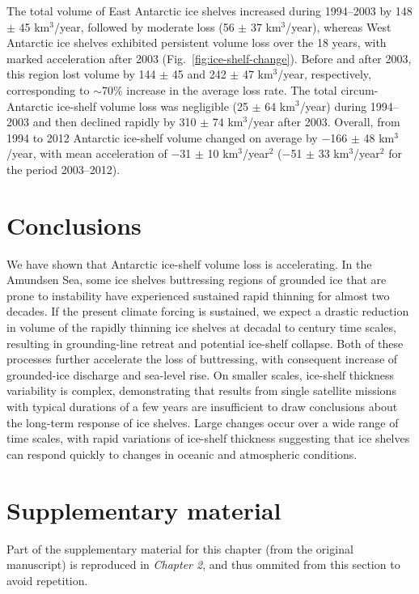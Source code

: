 The total volume of East Antarctic ice shelves
increased during 1994--2003 by 148 $\pm$ 45 km$^3$/year,
followed by moderate loss (56 $\pm$ 37 km$^3$/year),
whereas West Antarctic ice shelves exhibited
persistent volume loss over the 18 years, with
marked acceleration after 2003 (Fig.~\ref{fig:ice-shelf-change}). Before
and after 2003, this region lost volume by 144 $\pm$ 45 and 
242 $\pm$ 47 km$^3$/year, respectively, corresponding
to $\sim$70\% increase in the average loss
rate. The total circum-Antarctic ice-shelf volume
loss was negligible (25 $\pm$ 64 km$^3$/year) during
1994--2003 and then declined rapidly by 
310 $\pm$ 74 km$^3$/year after 2003. Overall, from 1994 to
2012 Antarctic ice-shelf volume changed on average
by $-$166 $\pm$ 48 km$^3$/year, with mean acceleration
of $-$31 $\pm$ 10 km$^3$/year$^2$ ($-$51 $\pm$ 33 km$^3$/year$^2$ for the
period 2003--2012).

\section{Conclusions}

\noindent
We have shown that Antarctic ice-shelf volume
loss is accelerating. In the Amundsen Sea,
some ice shelves buttressing regions of grounded
ice that are prone to instability have experienced
sustained rapid thinning for almost two decades.
If the present climate forcing is sustained, we
expect a drastic reduction in volume of the rapidly
thinning ice shelves at decadal to century
time scales, resulting in grounding-line retreat
and potential ice-shelf collapse. Both of these processes
further accelerate the loss of buttressing,
with consequent increase of grounded-ice
discharge and sea-level rise. On smaller scales,
ice-shelf thickness variability is complex, demonstrating
that results from single satellite missions
with typical durations of a few years are
insufficient to draw conclusions about the long-term
response of ice shelves. Large changes occur
over a wide range of time scales, with rapid variations
of ice-shelf thickness suggesting that ice
shelves can respond quickly to changes in oceanic
and atmospheric conditions.


\section{Supplementary material}

\noindent
Part of the supplementary material for this chapter (from the original manuscript) is reproduced in {\sl Chapter 2}, and thus ommited from this section to avoid repetition.

